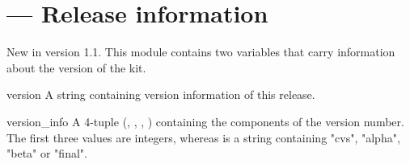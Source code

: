 \section{ ---
         Release information}


New in version 1.1. This module contains two variables that carry
information about the version of the kit.

\begin{datadesc}{version}
A string containing version information of this release.
\end{datadesc}

\begin{datadesc}{version_info}
A 4-tuple (, , , )
containing the components of the version number. The first three
values are integers, whereas  is a string containing
"cvs", "alpha", "beta" or "final".
\end{datadesc}
